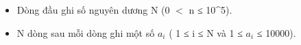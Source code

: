 \begin{itemize}
	\item     Dòng đầu ghi số nguyên dương N (0 $<$ n ≤ 10^5).   
	\item     N dòng sau mỗi dòng ghi một số $a_{i}$    ( 1 ≤ i ≤ N và 1 ≤ $a_{i}$    ≤ 10000).   
\end{itemize}